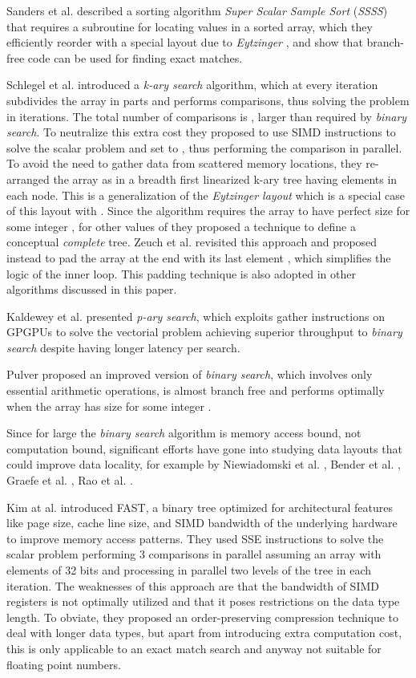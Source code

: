 \documentclass[preprint,1p,times]{elsarticle}
\begin{document}
Sanders et al. \cite{Sanders2004} described a sorting algorithm \textit{Super Scalar Sample Sort}
(\textit{SSSS}) that requires a subroutine for locating values in a sorted array, which they efficiently reorder with a special layout due to \textit{Eytzinger} \cite{Eytzinger1590}, and show that branch-free code can be used for finding exact matches.

Schlegel et al. \cite{kary2009} introduced a \textit{k-ary search} algorithm, which at every iteration subdivides the array  in  parts and performs  comparisons, thus solving the problem in  iterations. The total number of comparisons is , larger than  required by \textit{binary search}. To neutralize this extra cost they proposed to use SIMD instructions to solve the scalar problem and set  to , thus performing the  comparison in parallel. To avoid the need to gather data from scattered memory locations, they re-arranged the array  as in a breadth first linearized k-ary tree having  elements in each node. This is a generalization of the \textit{Eytzinger layout} which is a special case of this layout with . Since the algorithm requires the array  to have perfect size  for some integer , for other values of  they proposed a technique to define a conceptual \textit{complete} tree. Zeuch et al. \cite{kary2014} revisited this approach and proposed instead to pad the array at the end with its last element , which simplifies the logic of the inner loop. This padding technique is also adopted in other algorithms discussed in this paper.

Kaldewey et al. \cite{Kaldewey2009} presented \textit{p-ary search}, which exploits gather instructions on GPGPUs to solve the vectorial problem achieving superior throughput to \textit{binary search} despite having longer latency per search.

Pulver \cite{Pulver2011} proposed an improved version of \textit{binary search}, which involves only essential arithmetic operations, is almost branch free and performs optimally when the array  has size  for some integer .

Since for large  the \textit{binary search} algorithm is memory access bound, not computation bound, significant efforts have gone into studying data layouts that could improve data locality, for example by Niewiadomski et al. \cite{Niewiadomski2006}, Bender et al. \cite{Bender2005}, Graefe et al. \cite{Graefe2001}, Rao et al. \cite{Rao1999}. 

Kim at al. \cite{Kim2011} introduced FAST, a binary tree optimized for architectural features like page size, cache line size, and SIMD bandwidth of the underlying hardware to improve memory access patterns. They used SSE instructions to solve the scalar problem performing 3 comparisons in parallel assuming an array  with elements of 32 bits and processing in parallel two levels of the tree in each iteration. The weaknesses of this approach are that the bandwidth of SIMD registers is not optimally utilized and that it poses restrictions on the data type length. To obviate, they proposed an order-preserving compression technique to deal with longer data types, but apart from introducing extra computation cost, this is only applicable to an exact match search and anyway not suitable for floating point numbers.
\end{document}
